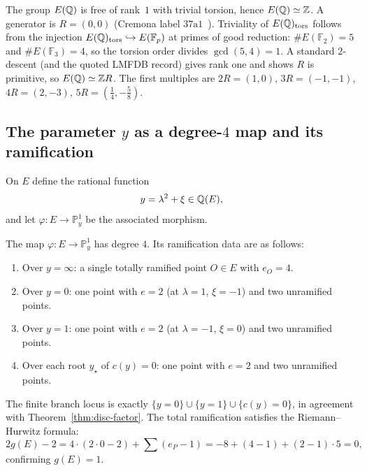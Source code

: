 \begin{remark}\label{rmk:mordell-weil}
The group $E(\mathbb{Q})$ is free of rank~$1$ with trivial torsion, hence $E(\mathbb{Q})\simeq\mathbb{Z}$.
A generator is $R=(0,0)$ (Cremona label $37\mathrm{a}1$~\cite{LMFDBEllipticCurve37a1}).
Triviality of $E(\mathbb{Q})_{\mathrm{tors}}$ follows from the injection $E(\mathbb{Q})_{\mathrm{tors}}\hookrightarrow E(\mathbb{F}_p)$ at primes of good reduction: $\#E(\mathbb{F}_2)=5$ and $\#E(\mathbb{F}_3)=4$, so the torsion order divides $\gcd(5,4)=1$.
A standard $2$-descent (and the quoted LMFDB record) gives rank one and shows $R$ is primitive, so $E(\mathbb{Q})\simeq \mathbb{Z} R$.
The first multiples are $2R=(1,0)$, $3R=(-1,-1)$, $4R=(2,-3)$, $5R=(\tfrac{1}{4},-\tfrac{5}{8})$.
\end{remark}

\subsection{The parameter \texorpdfstring{$y$}{y} as a degree-\texorpdfstring{$4$}{4} map and its ramification}

On $E$ define the rational function
\begin{equation}\label{eq:y-as-function}
y=\lambda^2+\xi\in \mathbb{Q}(E),
\end{equation}
and let $\varphi:E\to \mathbb{P}^1_y$ be the associated morphism.

\begin{theorem}\label{thm:ramification-image}
The map $\varphi:E\to \mathbb{P}^1_y$ has degree $4$.
Its ramification data are as follows:
\begin{enumerate}
\item[(i)] Over $y=\infty$: a single totally ramified point $O\in E$ with $e_O=4$.
\item[(ii)] Over $y=0$: one point with $e=2$ (at $\lambda=1$, $\xi=-1$) and two unramified points.
\item[(iii)] Over $y=1$: one point with $e=2$ (at $\lambda=-1$, $\xi=0$) and two unramified points.
\item[(iv)] Over each root $y_\star$ of $c(y)=0$: one point with $e=2$ and two unramified points.
\end{enumerate}
The finite branch locus is exactly $\{y=0\}\cup\{y=1\}\cup\{c(y)=0\}$, in agreement with Theorem~\ref{thm:disc-factor}.
The total ramification satisfies the Riemann--Hurwitz formula:
\[
2g(E)-2=4\cdot(2\cdot 0-2)+\sum(e_P-1)=-8+(4-1)+(2-1)\cdot 5=0,
\]
confirming $g(E)=1$.
\end{theorem}

